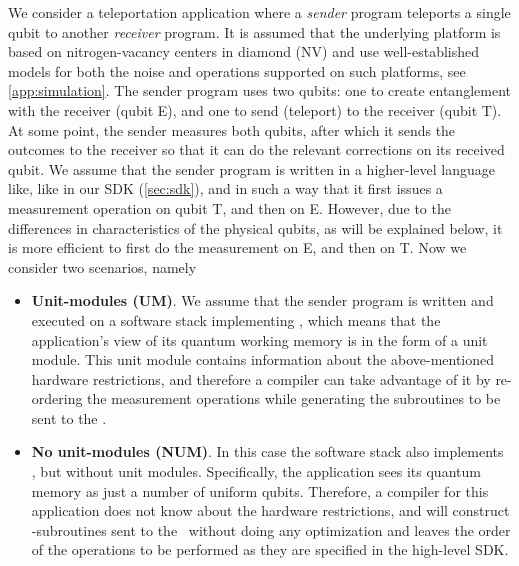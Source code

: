 We consider a teleportation application where a \textit{sender} program teleports a single qubit to another \textit{receiver} program.
It is assumed that the underlying platform is based on nitrogen-vacancy centers in diamond (NV) and use well-established models for both the noise and operations supported on such platforms, see \cref{app:simulation}.
The sender program uses two qubits: one to create entanglement with the receiver (qubit E), and one to send (teleport) to the receiver (qubit T).
At some point, the sender measures both qubits, after which it sends the outcomes to the receiver so that it can do the relevant corrections on its received qubit.
We assume that the sender program is written in a higher-level language like, like in our SDK (\cref{sec:sdk}), and in such a way that it first issues a measurement operation on qubit T, and then on E. However, due to the differences in characteristics of the physical qubits, as will be explained below, it is more efficient to first do the measurement on E, and then on T. Now we consider two scenarios, namely
\begin{itemize}
  \item \textbf{Unit-modules (UM)}.
        We assume that the sender program is written and executed on a software stack implementing \netqasm, which means that the application's view of its quantum working memory is in the form of a unit module.
        This unit module contains information about the above-mentioned hardware restrictions, and therefore a compiler can take advantage of it by re-ordering the measurement operations while generating the \netqasm subroutines to be sent to the \QNPU.
  \item \textbf{No unit-modules (NUM)}.
        In this case the software stack also implements \netqasm, but without unit modules.
        Specifically, the application sees its quantum memory as just a number of uniform qubits.
        Therefore, a compiler for this application does not know about the hardware restrictions, and will construct \netqasm-subroutines sent to the \QNPU\ without doing any optimization and leaves the order of the operations to be performed as they are specified in the high-level SDK.
\end{itemize}

